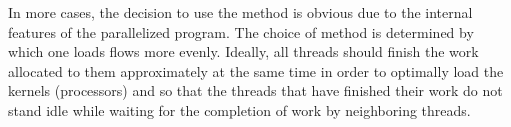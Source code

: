 {	\par In more cases, the decision to use the method is obvious due to the internal features of the parallelized program. The choice of method is determined by which one loads flows more evenly. Ideally, all threads should finish the work allocated to them approximately at the same time in order to optimally load the kernels (processors) and so that the threads that have finished their work do not stand idle while waiting for the completion of work by neighboring threads.
	\par
}